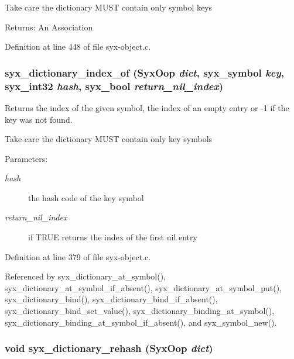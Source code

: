 Take care the dictionary MUST contain only symbol keys

\begin{Desc}
\item[Returns:]An Association \end{Desc}


Definition at line 448 of file syx-object.c.\hypertarget{syx-object_8c_731782a713f0ca043fd3c589bdce9c75}{
\subsubsection{ syx\_\-dictionary\_\-index\_\-of ({\bf SyxOop} {\em dict}, \/  {\bf syx\_\-symbol} {\em key}, \/  {\bf syx\_\-int32} {\em hash}, \/  {\bf syx\_\-bool} {\em return\_\-nil\_\-index})}}
\label{syx-object_8c_731782a713f0ca043fd3c589bdce9c75}


Returns the index of the given symbol, the index of an empty entry or -1 if the key was not found.

Take care the dictionary MUST contain only key symbols

\begin{Desc}
\item[Parameters:]
\begin{description}
\item[{\em hash}]the hash code of the key symbol \item[{\em return\_\-nil\_\-index}]if TRUE returns the index of the first nil entry \end{description}
\end{Desc}


Definition at line 379 of file syx-object.c.

Referenced by syx\_\-dictionary\_\-at\_\-symbol(), syx\_\-dictionary\_\-at\_\-symbol\_\-if\_\-absent(), syx\_\-dictionary\_\-at\_\-symbol\_\-put(), syx\_\-dictionary\_\-bind(), syx\_\-dictionary\_\-bind\_\-if\_\-absent(), syx\_\-dictionary\_\-bind\_\-set\_\-value(), syx\_\-dictionary\_\-binding\_\-at\_\-symbol(), syx\_\-dictionary\_\-binding\_\-at\_\-symbol\_\-if\_\-absent(), and syx\_\-symbol\_\-new().\hypertarget{syx-object_8c_1517818caf6e5acff8ac8b23b1ff9294}{
\subsubsection{\setlength{\rightskip}{0pt plus 5cm}void syx\_\-dictionary\_\-rehash ({\bf SyxOop} {\em dict})}}
\label{syx-object_8c_1517818caf6e5acff8ac8b23b1ff9294}


